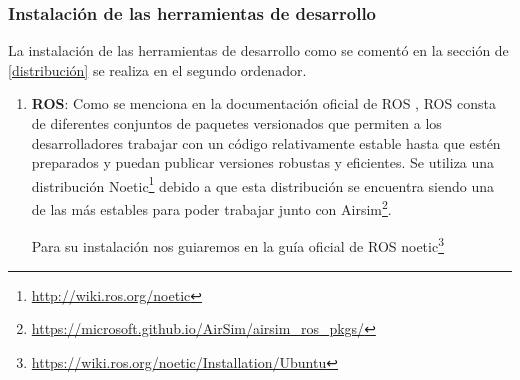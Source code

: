   \subsubsection{Instalación de las herramientas de desarrollo}
  \label{subsec:Instalación de las herramientas de desarrollo}
  La instalación de las herramientas de desarrollo como se comentó en la sección de \ref{distribución} se realiza en el segundo ordenador.
  \begin{enumerate}
    \item \textbf{ROS}: Como se menciona en la documentación oficial de ROS \cite{Dis_ROS}, ROS consta de diferentes conjuntos de paquetes versionados que permiten a los desarrolladores
    trabajar con un código relativamente estable hasta que estén preparados y puedan publicar versiones robustas y eficientes. Se utiliza una distribución Noetic\footnote{\url{http://wiki.ros.org/noetic}}
    debido a que esta distribución se encuentra siendo una de las más estables para poder trabajar junto con Airsim\footnote{\url{https://microsoft.github.io/AirSim/airsim_ros_pkgs/}}.

    Para su instalación nos guiaremos en la guía oficial de ROS noetic\footnote{\url{https://wiki.ros.org/noetic/Installation/Ubuntu}}


\end{enumerate}
